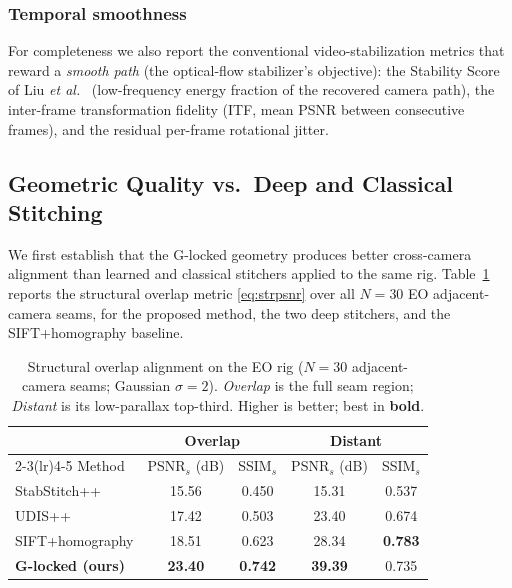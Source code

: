 \documentclass[journal]{IEEEtran}
\newcommand{\etal}{\textit{et al.}}
\begin{document}
\subsubsection{Temporal smoothness}
For completeness we also report the conventional video-stabilization metrics that reward a \emph{smooth path} (the optical-flow stabilizer's objective): the Stability Score of Liu \etal\ \cite{liu2013bundled} (low-frequency energy fraction of the recovered camera path), the inter-frame transformation fidelity (ITF, mean PSNR between consecutive frames), and the residual per-frame rotational jitter.

\subsection{Geometric Quality vs.\ Deep and Classical Stitching}
\label{sec:stitchcompare}
We first establish that the G-locked geometry produces better cross-camera alignment than learned and classical stitchers applied to the same rig. Table~\ref{tab:stitch} reports the structural overlap metric \eqref{eq:strpsnr} over all $N=30$ EO adjacent-camera seams, for the proposed method, the two deep stitchers, and the SIFT+homography baseline.

\begin{table}[t]
\caption{Structural overlap alignment on the EO rig ($N=30$ adjacent-camera seams; Gaussian $\sigma{=}2$). \emph{Overlap} is the full seam region; \emph{Distant} is its low-parallax top-third. Higher is better; best in \textbf{bold}.}
\label{tab:stitch}
\centering
\footnotesize
\begin{tabular}{@{}lcccc@{}}
\toprule
& \multicolumn{2}{c}{Overlap} & \multicolumn{2}{c}{Distant} \\
\cmidrule(lr){2-3}\cmidrule(lr){4-5}
Method & PSNR$_s$ (dB) & SSIM$_s$ & PSNR$_s$ (dB) & SSIM$_s$ \\
\midrule
StabStitch++ \cite{nie2025stabstitch2} & 15.56 & 0.450 & 15.31 & 0.537 \\
UDIS++ \cite{nie2023parallax}          & 17.42 & 0.503 & 23.40 & 0.674 \\
SIFT+homography \cite{brown2007panorama} & 18.51 & 0.623 & 28.34 & \textbf{0.783} \\
\textbf{G-locked (ours)}               & \textbf{23.40} & \textbf{0.742} & \textbf{39.39} & 0.735 \\
\bottomrule
\end{tabular}
\end{table}
\end{document}
